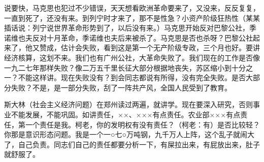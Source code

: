 说要快，马克思也犯过不少错误，天天想看欧洲革命要来了，又没来，反反复复，一直到死了，还没有来。到列宁时才来了，那不是性急？小资产阶级狂热性（某某插话说：列宁说世界革命形势到了，以后没有来。）马克思开始反对巴黎公社，季诺维也夫反对十月革命，季诺维也夫后来被杀了。马克思是否也杀呀？巴黎公社起来了，他又赞成，估计会失败，看到这是第一个无产阶级专政，三个月也好。要讲经济核算，这划不来。我们也有广州公社，大革命失败了。我们现在的工作是否像一九二七年那样失败？像二万五千里长征大部分根据地丧失，苏区缩小到十分之一？不能这样讲。现在失败没有？到会同志都说有所得，没有完全失败。是否大部分失败？不是，是一部分失败，刮了一阵共产风，全国人民受到了教育。

斯大林（社会主义经济问题）在郑州读过两遍，就讲学。现在要深入研究，否则事业不能发展，不能巩固。如讲责任，××、×××有点责任。农业部×××有点责任，第一个责任是我。柯老，你的发明权有没有责任？（柯老：有）是否比较轻？你那是意识形态问题。我是一个一○七○万吨钢，九千万人上阵，这个乱子就闹大了，自己负责。同志们自己的责任都要分析一下，有屎拉出来，有屁放出来，肚子就舒服了。


